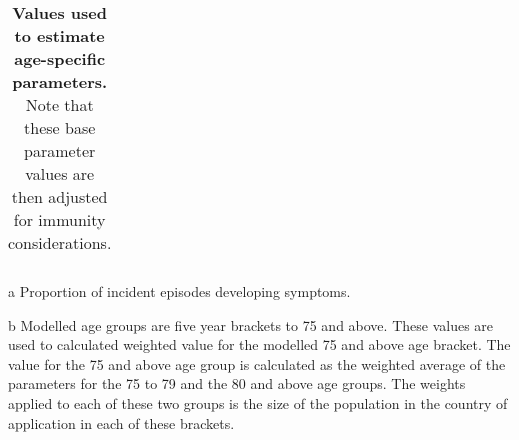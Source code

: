 \begin{table}
\begin{threeparttable}
\begin{tabularx}{\textwidth}{| X | X | X | X | X |}
        \hline
	\end{tabularx}
	\caption{\textbf{Values used to estimate age-specific parameters.}
    Note that these base parameter values are then adjusted for immunity considerations.}
	\label{tab:age_params}
    \begin{tablenotes}
        \item[a] Proportion of incident episodes developing symptoms.
        \item[b] Modelled age groups are five year brackets to 75 and above.
        These values are used to calculated weighted value for the modelled 75 and above age bracket.
        The value for the 75 and above age group is calculated as the weighted average of the parameters for the 75 to 79 and the 80 and above age groups.
        The weights applied to each of these two groups is the size of the population in the country of application in each of these brackets.
    \end{tablenotes}
    \end{threeparttable}
\end{table}
